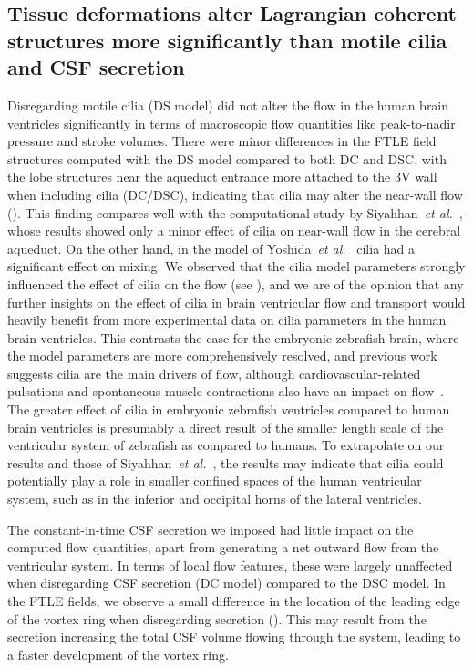 \documentclass{template}
\begin{document}
\subsection{Tissue deformations alter Lagrangian coherent structures more significantly
than motile cilia and CSF secretion}
Disregarding motile cilia (DS model) did not alter the flow in the human brain ventricles significantly
in terms of macroscopic flow quantities like peak-to-nadir pressure and stroke volumes. 
There were minor differences in the FTLE field structures computed with the DS model compared
to both DC and DSC, with the lobe structures near the aqueduct
entrance more attached to the 3V wall when including cilia (DC/DSC),
indicating that cilia may alter the near-wall flow ().
This finding compares well with the computational study
by Siyahhan~\emph{et al.}~\citep{Siyahhan2014FlowVentricles},
whose results showed only a minor effect of cilia on near-wall flow in the cerebral aqueduct.
On the other hand, in the model of Yoshida~\emph{et al.}~\citep{Yoshida2022EffectVentricles} 
cilia had a significant effect on mixing. We observed that the cilia model parameters
strongly influenced the effect of cilia on the flow (see ),
and we are of the opinion that any further insights on the effect of cilia in
brain ventricular flow and transport would heavily benefit from more experimental data
on cilia parameters in the human brain ventricles.
This contrasts the case for the embryonic zebrafish brain, where the model parameters
are more comprehensively resolved, and previous work suggests cilia are
the main drivers of flow, although cardiovascular-related pulsations and
spontaneous muscle contractions also have an impact
on flow~\citep{Olstad2019CiliaryDevelopment, Herlyng2025AdvectionDiffusion, Thouvenin2020OriginCanal}.
The greater effect of cilia in embryonic zebrafish ventricles compared to
human brain ventricles is presumably a direct result of the smaller
length scale of the ventricular system of zebrafish as compared to humans. To extrapolate on
our results and those of Siyahhan~\emph{et al.}~\citep{Siyahhan2014FlowVentricles}, the results
may indicate that cilia could potentially play a 
role in smaller confined spaces of the human ventricular system,
such as in the inferior and occipital horns of the lateral ventricles.

The constant-in-time CSF secretion we imposed had little impact on the
computed flow quantities, apart from generating a net outward flow from the
ventricular system. In terms of local flow features,
these were largely unaffected when disregarding CSF secretion (DC model)
compared to the DSC model. In the FTLE fields, we observe a small
difference in the location of the leading edge of the vortex ring
when disregarding secretion ().
This may result from the secretion increasing the total CSF volume
flowing through the system, leading to a faster development of the vortex ring.
\end{document}
